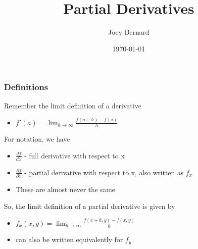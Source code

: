 \documentclass{beamer}
\title{Partial Derivatives}
\author{Joey Bernard}
\institute{University of New Brunswick}
\date{\today}
\begin{document}
\begin{frame}
  \titlepage
\end{frame}

\begin{frame}
  \frametitle{Definitions}
  Remember the limit definition of a derivative
  \begin{itemize}
  \item $ f'(a) = \lim_{h\to\infty} \frac{f(a+h) - f(a)}{h}$
  \end{itemize}

  For notation, we have
  \begin{itemize}
  \item $\frac{df}{dx}$  -  full derivative with respect to x
  \item $\frac{\partial f}{\partial x}$  -  partial derivative with respect to x, also written as $f_x$
  \item These are almost never the same
  \end{itemize}

  So, the limit definition of a partial derivative is given by
  \begin{itemize}
  \item $f_x(x, y) = \lim_{h\to\infty} \frac{f(x+h, y) - f(x, y)}{h}$
  \item can also be written equivalently for $f_y$
  \end{itemize}
  
\end{frame}
\end{document}
